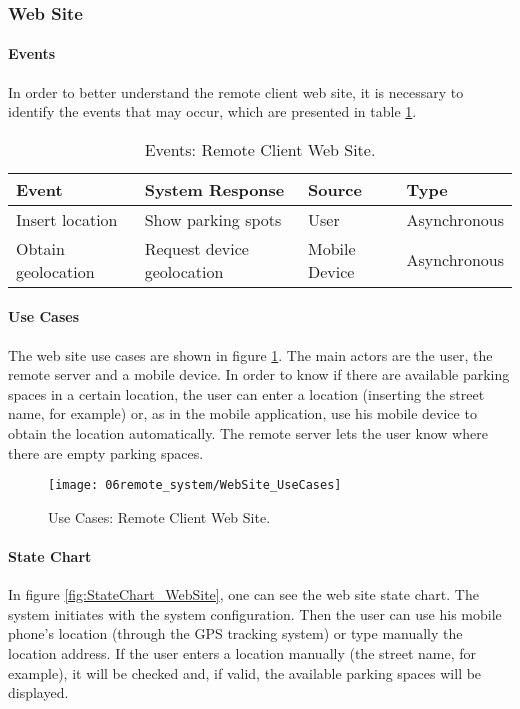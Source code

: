 \subsubsection{Web Site}
\paragraph*{Events}
In order to better understand the remote client web site, it is necessary to identify the events that may occur, which are presented in table \ref{table:rc_web_events}.

\begin{table}[ht]
	\centering
	\resizebox{\columnwidth}{!}
	{
		\begin{tabular}{|m{3cm}|m{5cm}|m{2.4cm}|m{2.4cm}|}
			\hline
			\textbf{Event} & \textbf{System Response} & \textbf{Source} & \textbf{Type}\\
			\hline\hline
			Insert location	& Show parking spots & User & Asynchronous\\
			\hline
			
			Obtain geolocation & Request device geolocation & Mobile Device & Asynchronous\\
			\hline
			
		\end{tabular}
	}
	\caption{Events: Remote Client Web Site.}
	\label{table:rc_web_events}
\end{table}

\paragraph*{Use Cases}
The web site use cases are shown in figure \ref{fig:UseCases_WebSite}. The main actors are the user, the remote server and a mobile device. In order to know if there are available parking spaces in a certain location, the user can enter a location (inserting the street name, for example) or, as in the mobile application, use his mobile device to obtain the location automatically. The remote server lets the user know where there are empty parking spaces.

\begin{figure}[H]
	\centering
	\texttt{[image: 06remote\_system/WebSite\_UseCases]}
	\caption{Use Cases: Remote Client Web Site.}
	\label{fig:UseCases_WebSite}
\end{figure}

\clearpage
\paragraph*{State Chart}
In figure \ref{fig:StateChart_WebSite}, one can see the web site state chart. The system initiates with the system configuration. Then the user can use his mobile phone's location (through the GPS tracking system) or type manually the location address. If the user enters a location manually (the street name, for example), it will be checked and, if valid, the available parking spaces will be displayed.

